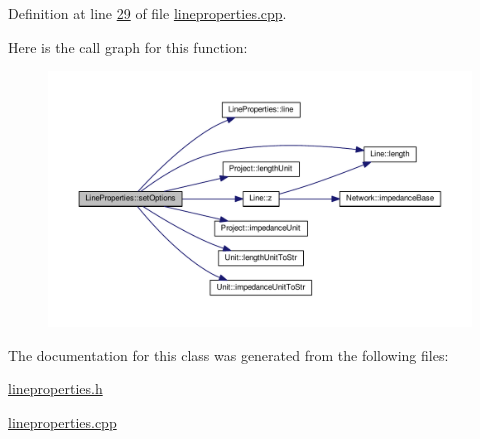 Definition at line \hyperlink{lineproperties_8cpp_source_l00029}{29} of file \hyperlink{lineproperties_8cpp_source}{lineproperties.\+cpp}.



Here is the call graph for this function\+:\nopagebreak
\begin{figure}[H]
\begin{center}
\leavevmode
\includegraphics[width=350pt]{class_line_properties_ad434fc8e65787648a44737fb9f46b475_cgraph}
\end{center}
\end{figure}




The documentation for this class was generated from the following files\+:\begin{DoxyCompactItemize}
\item 
\hyperlink{lineproperties_8h}{lineproperties.\+h}\item 
\hyperlink{lineproperties_8cpp}{lineproperties.\+cpp}\end{DoxyCompactItemize}
